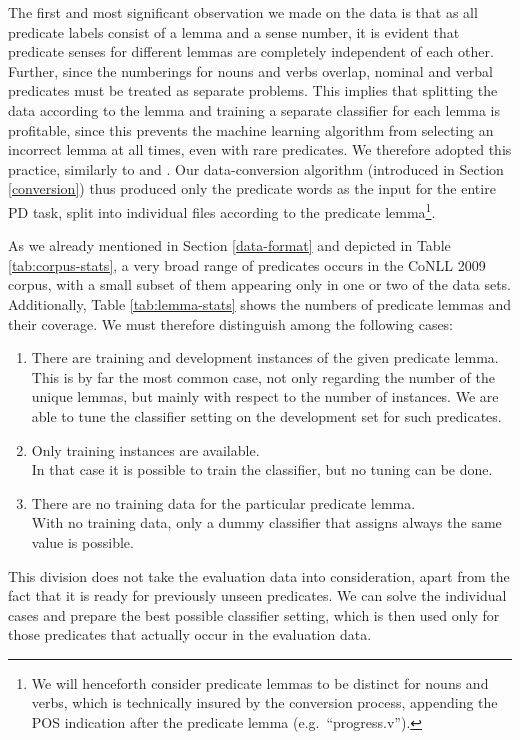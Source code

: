 \documentclass[12pt,notitlepage,a4paper]{report}
\begin{document}
The first and most significant observation we made on the data is that as all predicate labels consist of a lemma and a sense number, it is evident that predicate senses for different lemmas are completely independent of each other. Further, since the numberings for nouns and verbs overlap, nominal and verbal predicates must be treated as separate problems. This implies that splitting the data according to the lemma and training a separate classifier for each lemma is profitable, since this prevents the machine learning algorithm from selecting an incorrect lemma at all times, even with rare predicates. We therefore adopted this practice, similarly to \citet{che09} and \citet{nugues09}. Our data-conversion algorithm (introduced in Section \ref{conversion}) thus produced only the predicate words as the input for the entire PD task, split into individual files according to the predicate lemma\footnote{We will henceforth consider predicate lemmas to be distinct for nouns and verbs, which is technically insured by the conversion process, appending the POS indication after the predicate lemma (e.g.\ ``progress.v'').}.

As we already mentioned in Section \ref{data-format} and depicted in Table \ref{tab:corpus-stats}, a very broad range of predicates occurs in the CoNLL 2009 corpus, with a small subset of them appearing only in one or two of the data sets. Additionally, Table \ref{tab:lemma-stats} shows the numbers of predicate lemmas and their coverage. We must therefore distinguish among the following cases:
\begin{enumerate}
    \item There are training and development instances of the given predicate lemma. \\
This is by far the most common case, not only regarding the number of the unique lemmas, but mainly with respect to the number of instances. We are able to tune the classifier setting on the development set for such predicates.
    \item Only training instances are available. \\
In that case it is possible to train the classifier, but no tuning can be done.
    \item There are no training data for the particular predicate lemma. \\
With no training data, only a dummy classifier that assigns always the same value is possible.
\end{enumerate}
This division does not take the evaluation data into consideration, apart from the fact that it is ready for previously unseen predicates. We can solve the individual cases and prepare the best possible classifier setting, which is then used only for those predicates that actually occur in the evaluation data.
\end{document}
